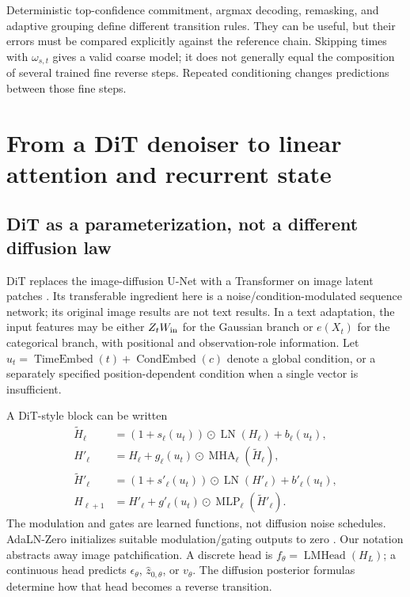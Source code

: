 \documentclass{article}
\theoremstyle{remark}\newtheorem{remark}[theorem]{Remark}
\begin{document}
Deterministic top-confidence commitment, argmax decoding, remasking, and adaptive grouping define different transition rules. They can be useful, but their errors must be compared explicitly against the reference chain. Skipping times with $\omega_{s,t}$ gives a valid coarse model; it does not generally equal the composition of several trained fine reverse steps. Repeated conditioning changes predictions between those fine steps.

\section{From a DiT denoiser to linear attention and recurrent state}
\label{sec:linearization}
\subsection{DiT as a parameterization, not a different diffusion law}
DiT replaces the image-diffusion U-Net with a Transformer on image latent patches \cite{dit,ldm}. Its transferable ingredient here is a noise/condition-modulated sequence network; its original image results are not text results. In a text adaptation, the input features may be either $Z_tW_{\rm in}$ for the Gaussian branch or $e(X_t)$ for the categorical branch, with positional and observation-role information. Let $u_t=\operatorname{TimeEmbed}(t)+\operatorname{CondEmbed}(c)$ denote a global condition, or a separately specified position-dependent condition when a single vector is insufficient.

A DiT-style block can be written
\begin{align}
 \widetilde H_\ell&=(1+s_\ell(u_t))\odot\operatorname{LN}(H_\ell)+b_\ell(u_t),\nonumber\\
 H'_\ell&=H_\ell+g_\ell(u_t)\odot\operatorname{MHA}_\ell(\widetilde H_\ell),\nonumber\\
 \widetilde H'_\ell&=(1+s'_\ell(u_t))\odot\operatorname{LN}(H'_\ell)+b'_\ell(u_t),\nonumber\\
 H_{\ell+1}&=H'_\ell+g'_\ell(u_t)\odot\operatorname{MLP}_\ell(\widetilde H'_\ell).
 \label{eq:ditblock}
\end{align}
The modulation and gates are learned functions, not diffusion noise schedules. AdaLN-Zero initializes suitable modulation/gating outputs to zero \cite{dit,ditcode}. Our notation abstracts away image patchification. A discrete head is $f_\theta=\operatorname{LMHead}(H_L)$; a continuous head predicts $\epsilon_\theta$, $\widehat z_{0,\theta}$, or $v_\theta$. The diffusion posterior formulas determine how that head becomes a reverse transition.
\end{document}
